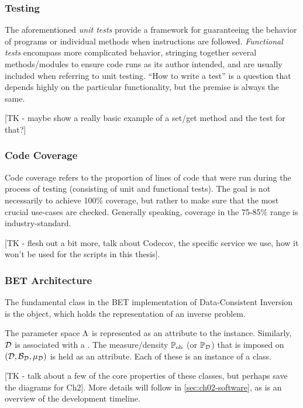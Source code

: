 \subsubsection{Testing}\label{sec:unit-testing}
The aforementioned \emph{unit tests} provide a framework for guaranteeing the behavior of programs or individual methods when instructions are followed.
\emph{Functional tests} encompass more complicated behavior, stringing together several methods/modules to ensure code runs as its author intended, and are usually included when referring to unit testing.
``How to write a test'' is a question that depends highly on the particular functionality, but the premise is always the same.

[TK - maybe show a really basic example of a set/get method and the test for that?]



\subsubsection{Code Coverage}\label{sec:code-coverage}

Code coverage refers to the proportion of lines of code that were run during the process of testing (consisting of unit and functional tests).
The goal is not necessarily to achieve 100\% coverage, but rather to make sure that the most crucial use-cases are checked.
Generally speaking, coverage in the 75-85\% range is industry-standard.

[TK - flesh out a bit more, talk about Codecov, the specific service we use, how it won't be used for the scripts in this thesis].


\subsubsection{BET Architecture}\label{sec:bet-architecture-overview}

The fundamental class in the BET implementation of Data-Consistent Inversion is the  object, which holds the representation of an inverse problem.

The parameter space ${\Lambda}$ is represented as an  attribute to the  instance.
Similarly, $\mathcal{D}$ is associated with a .
The measure/density $\operatorname*{\mathbb{P}_{ob}}$ (or $\mathbb{P}_{\mathcal{D}}$) that is imposed on $(\mathcal{D}, \mathcal{B}_{\mathcal{D}}, \mu_{\mathcal{D}})$ is held as an  attribute.
Each of these is an instance of a  class.

[TK - talk about a few of the core properties of these classes, but perhaps save the diagrams for Ch2].
More details will follow in \ref{sec:ch02-software}, as is an overview of the development timeline.
